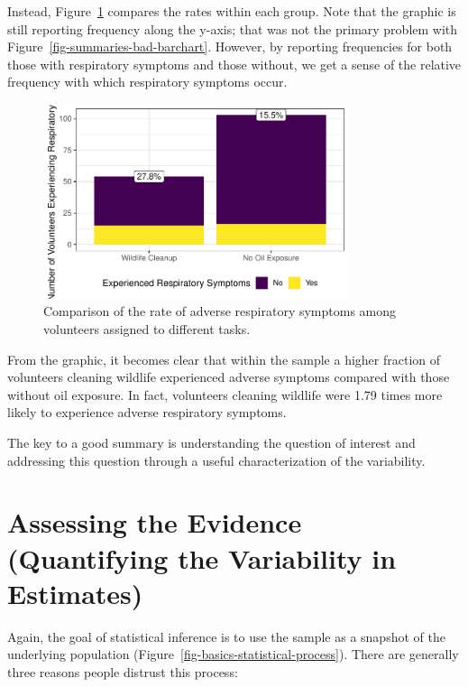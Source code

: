 \documentclass[
  letterpaper,
  DIV=11,
  numbers=noendperiod]{scrreprt}
\theoremstyle{definition}
\theoremstyle{definition}
\theoremstyle{plain}
\theoremstyle{remark}
\begin{document}
Instead, Figure~\ref{fig-summaries-good-barchart} compares the rates
within each group. Note that the graphic is still reporting frequency
along the y-axis; that was not the primary problem with
Figure~\ref{fig-summaries-bad-barchart}. However, by reporting
frequencies for both those with respiratory symptoms and those without,
we get a sense of the relative frequency with which respiratory symptoms
occur.

\begin{figure}

{\centering \includegraphics[width=0.8\textwidth,height=\textheight]{./images/fig-summaries-good-barchart-1.pdf}

}

\caption{\label{fig-summaries-good-barchart}Comparison of the rate of
adverse respiratory symptoms among volunteers assigned to different
tasks.}

\end{figure}

From the graphic, it becomes clear that within the sample a higher
fraction of volunteers cleaning wildlife experienced adverse symptoms
compared with those without oil exposure. In fact, volunteers cleaning
wildlife were 1.79 times more likely to experience adverse respiratory
symptoms.

The key to a good summary is understanding the question of interest and
addressing this question through a useful characterization of the
variability.

\hypertarget{sec-samplingdistns}{%
\chapter{Assessing the Evidence (Quantifying the Variability in
Estimates)}\label{sec-samplingdistns}}

Again, the goal of statistical inference is to use the sample as a
snapshot of the underlying population
(Figure~\ref{fig-basics-statistical-process}). There are generally three
reasons people distrust this process:
\end{document}
